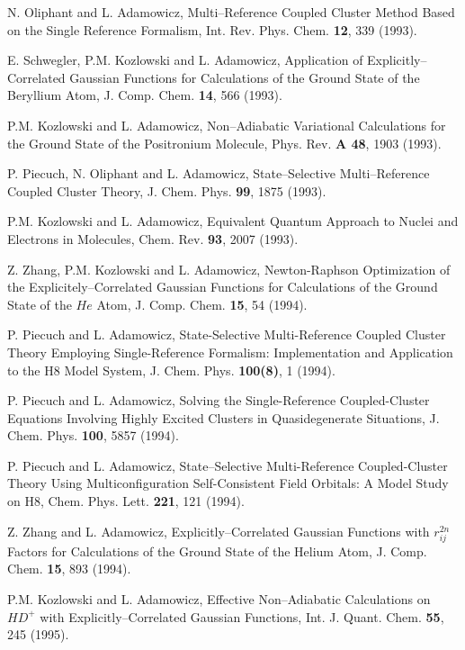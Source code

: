 {{\begin{thebibliography}{999}


N. Oliphant and L. Adamowicz, Multi--Reference Coupled Cluster 
Method Based on the Single
Reference Formalism, Int. Rev. Phys. Chem. {\bf 12}, 339 (1993).

E. Schwegler, P.M. Kozlowski and L. Adamowicz, 
Application of Explicitly--Correlated Gaussian
Functions for Calculations of the 
Ground State of the Beryllium Atom, J. Comp. Chem. {\bf 14}, 566 (1993).

P.M. Kozlowski and L. Adamowicz, Non--Adiabatic 
Variational Calculations for the Ground State of
the Positronium Molecule, Phys. Rev. {\bf A 48}, 1903 (1993).

   P. Piecuch, N. Oliphant and L. Adamowicz, 
State--Selective Multi--Reference Coupled Cluster Theory,
J. Chem. Phys. {\bf 99}, 1875 (1993).


P.M. Kozlowski and L. Adamowicz, Equivalent 
Quantum Approach to Nuclei and Electrons in
Molecules, Chem. Rev. {\bf 93}, 2007 (1993).


Z. Zhang, P.M. Kozlowski and L. Adamowicz, Newton-Raphson 
Optimization of the Explicitely--Correlated 
Gaussian Functions for Calculations of 
the Ground State of the $He$ Atom, J. Comp. Chem.
{\bf 15}, 54 (1994).



P. Piecuch and L. Adamowicz, State-Selective Multi-Reference 
Coupled Cluster Theory Employing
Single-Reference Formalism:  Implementation and Application 
to the H8 Model System, J. Chem. Phys.
{\bf 100(8)}, 1 (1994).

P. Piecuch and L. Adamowicz, Solving the Single-Reference 
Coupled-Cluster Equations Involving
Highly Excited Clusters in Quasidegenerate Situations, 
J. Chem. Phys. {\bf 100}, 5857 (1994).

P. Piecuch and L. Adamowicz, State--Selective 
Multi-Reference Coupled-Cluster Theory Using
Multiconfiguration Self-Consistent Field Orbitals:  A 
Model Study on H8, Chem. Phys. Lett. {\bf 221}, 121
(1994).

  Z. Zhang and L. Adamowicz, Explicitly--Correlated 
Gaussian Functions with $r_{ij}^{2n}$ Factors for Calculations
of the Ground State of the Helium Atom, J. Comp. Chem. 
{\bf 15}, 893 (1994).

  P.M. Kozlowski and L. Adamowicz, Effective 
Non--Adiabatic Calculations on $HD^{+}$ with 
Explicitly--Correlated Gaussian Functions, 
Int. J. Quant. Chem. {\bf 55}, 245 (1995).


\end{thebibliography}}}
